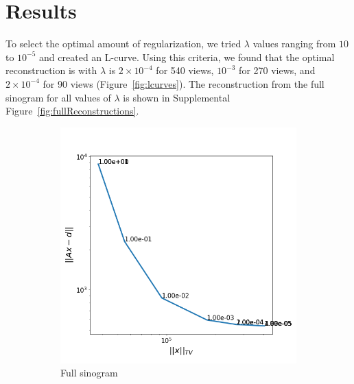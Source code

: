 \documentclass[12pt]{article}
\newcommand{\noin}{\noindent}
\begin{document}
\section{Results}
\noin To select the optimal amount of regularization, we tried $\lambda$ values ranging from $10$ to $10^{-5}$ and created an L-curve. Using this criteria, we found that the optimal reconstruction is with $\lambda$ is $2 \times 10^{-4}$ for 540 views, $10^{-3}$ for 270 views, and $2 \times 10^{-4}$ for 90 views (Figure~\ref{fig:lcurves}). The reconstruction from the full sinogram for all values of $\lambda$ is shown in Supplemental Figure~\ref{fig:fullReconstructions}.

\begin{figure}[h]
	\begin{subfigure}[t]{0.3\textwidth}
		\includegraphics[width=\linewidth]{../results/fistaFullLcurve.png}
		\caption{Full sinogram}
		\label{fig:lcurvefull}
	\end{subfigure}
	\hfill
	\begin{subfigure}[t]{0.3\textwidth}

\end{subfigure}
\end{figure}
\end{document}
